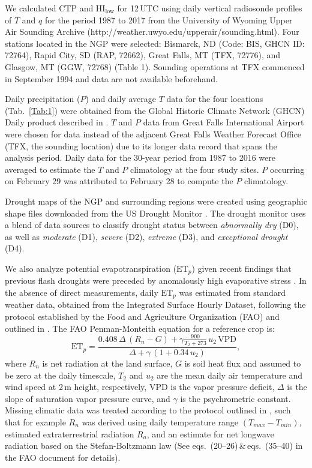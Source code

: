 \documentclass[hess, manuscript]{copernicus}
\begin{document}
We calculated CTP and $\mathrm{HI_{low}}$ for 12\,UTC using daily vertical radiosonde profiles of $T$ and $q$ for the period 1987 to 2017 from the University of Wyoming Upper Air Sounding Archive (http://weather.uwyo.edu/upperair/sounding.html). Four stations located in the NGP were selected: Bismarck, ND (Code: BIS, GHCN ID: 72764), Rapid City, SD (RAP, 72662), Great Falls, MT (TFX, 72776), and Glasgow, MT (GGW, 72768) (Table 1). Sounding operations at TFX commenced in September 1994 and data are not available beforehand.  

Daily precipitation ($P$) and daily average $T$ data for the four locations (Tab.~\ref{Tab:1}) were obtained from the Global Historic Climate Network (GHCN) Daily product described in \citet{Menne_2012b, Menne_2012a}. $T$ and $P$ data from Great Falls International Airport were chosen for data instead of the adjacent Great Falls Weather Forecast Office (TFX, the sounding location) due to its longer data record that spans the analysis period. Daily data for the 30-year period from 1987 to 2016 were averaged to estimate the $T$ and $P$ climatology at the four study sites. $P$ occurring on February 29 was attributed to February 28 to compute the $P$ climatology.

Drought maps of the NGP and surrounding regions were created using geographic shape files downloaded from the US Drought Monitor \citep{Svoboda_2002}. The drought monitor uses a blend of data sources to classify drought status between \emph{abnormally dry} (D0), as well as \emph{moderate} (D1), \emph{severe} (D2), \emph{extreme} (D3), and \emph{exceptional drought} (D4).

We also analyze potential evapotranspiration ($\mathrm{ET}_p$) given recent findings that previous flash droughts were preceded by anomalously high evaporative stress \citep{Otkin_2016, Ford_2017}. In the absence of direct measurements, daily $\mathrm{ET}_p$ was estimated from standard weather data, obtained from the Integrated Surface Hourly Dataset, following the protocol established by the Food and Agriculture Organization (FAO) and outlined in \citet{Allen_1998}. The FAO Penman-Monteith equation for a reference crop is:
%
\begin{equation}
\mathrm{ET}_p = \frac{0.408\,\Delta\,(R_n - G) +\gamma \frac{900}{T_2+273}\,u_2\,\mathrm{VPD}}{\Delta + \gamma\,(1+0.34\,u_2)}, 
\end{equation}
%
where $R_n$ is net radiation at the land surface, $G$ is soil heat flux and assumed to be zero at the daily timescale, $T_2$ and $u_2$ are the mean daily air temperature and wind speed at 2\,m height, respectively, VPD is the vapor pressure deficit, $\Delta$ is the slope of saturation vapor pressure curve, and $\gamma$ is the psychrometric constant. Missing climatic data was treated according to the protocol outlined in \citet{Allen_1998}, such that for example $R_n$ was derived using daily temperature range $(T_{max}-T_{min})$, estimated extraterrestrial radiation $R_a$, and an estimate for net longwave radiation based on the Stefan-Boltzmann law (See eqs.~(20--26)\,\&\,eqs.~(35--40) in the FAO document \citep{Allen_1998} for details). 
\end{document}
